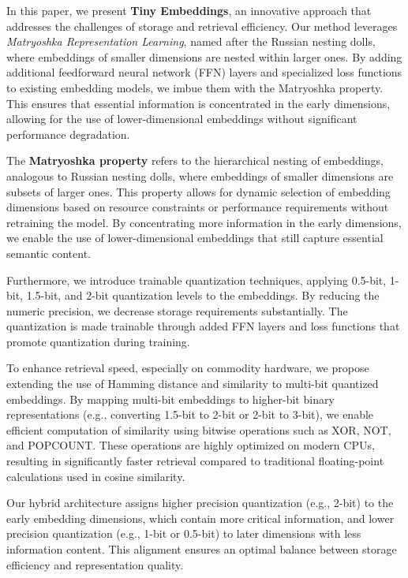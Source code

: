 \documentclass[acmtog, authorversion]{acmart}
\begin{document}
In this paper, we present \textbf{Tiny Embeddings}, an innovative approach that addresses the challenges of storage and retrieval efficiency. Our method leverages \textit{Matryoshka Representation Learning}, named after the Russian nesting dolls, where embeddings of smaller dimensions are nested within larger ones. By adding additional feedforward neural network (FFN) layers and specialized loss functions to existing embedding models, we imbue them with the Matryoshka property. This ensures that essential information is concentrated in the early dimensions, allowing for the use of lower-dimensional embeddings without significant performance degradation.  
  
The \textbf{Matryoshka property} refers to the hierarchical nesting of embeddings, analogous to Russian nesting dolls, where embeddings of smaller dimensions are subsets of larger ones. This property allows for dynamic selection of embedding dimensions based on resource constraints or performance requirements without retraining the model. By concentrating more information in the early dimensions, we enable the use of lower-dimensional embeddings that still capture essential semantic content.  

Furthermore, we introduce trainable quantization techniques, applying 0.5-bit, 1-bit, 1.5-bit, and 2-bit quantization levels to the embeddings. By reducing the numeric precision, we decrease storage requirements substantially. The quantization is made trainable through added FFN layers and loss functions that promote quantization during training.  
  
To enhance retrieval speed, especially on commodity hardware, we propose extending the use of Hamming distance and similarity to multi-bit quantized embeddings. By mapping multi-bit embeddings to higher-bit binary representations (e.g., converting 1.5-bit to 2-bit or 2-bit to 3-bit), we enable efficient computation of similarity using bitwise operations such as XOR, NOT, and POPCOUNT. These operations are highly optimized on modern CPUs, resulting in significantly faster retrieval compared to traditional floating-point calculations used in cosine similarity.  
  
Our hybrid architecture assigns higher precision quantization (e.g., 2-bit) to the early embedding dimensions, which contain more critical information, and lower precision quantization (e.g., 1-bit or 0.5-bit) to later dimensions with less information content. This alignment ensures an optimal balance between storage efficiency and representation quality.  
  
\end{document}
